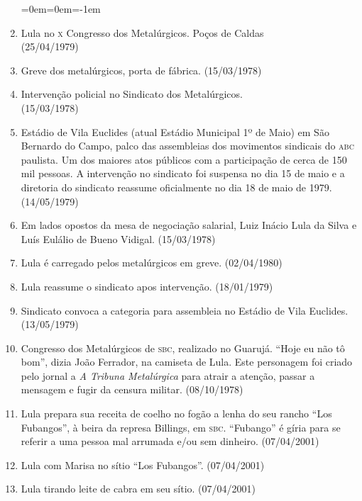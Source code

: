 \begin{enumerate}\parsep=0em\itemsep=0em\leftskip=-1em\normalsize
\item Lula no \textsc{x} Congresso dos Metalúrgicos. Poços de Caldas\\ (25/04/1979)

\item Greve dos metalúrgicos, porta de fábrica. (15/03/1978)

\item Intervenção policial no Sindicato dos Metalúrgicos.\\ (15/03/1978)

\item Estádio de Vila Euclides (atual Estádio Municipal 1º de Maio) em
São Bernardo do Campo, palco das assembleias dos movimentos sindicais do \textsc{abc}
paulista. Um dos maiores atos públicos com a participação de cerca de 150 mil
pessoas. A intervenção no sindicato foi suspensa no dia 15 de maio e a
diretoria do sindicato reassume oficialmente no dia 18 de maio de 1979.  (14/05/1979) 

\item Em lados opostos da mesa de negociação salarial, Luiz Inácio Lula da Silva e
Luís Eulálio de Bueno Vidigal. (15/03/1978)

\item Lula é carregado pelos metalúrgicos em greve. (02/04/1980)

\item Lula reassume o sindicato apos intervenção. (18/01/1979)

\item Sindicato convoca a categoria para assembleia no Estádio de Vila Euclides. (13/05/1979)

\item Congresso dos Metalúrgicos de \textsc{sbc}, realizado no Guarujá.  “Hoje eu não tô
bom”, dizia João Ferrador, na camiseta de Lula. Este personagem foi criado pelo
jornal a \textit{A Tribuna Metalúrgica} para atrair a atenção, passar a
mensagem e fugir da censura militar. (08/10/1978)

\item Lula prepara sua receita de coelho no fogão a lenha do seu rancho “Los Fubangos”, à beira da
represa Billings, em \textsc{sbc}. ``Fubango'' é gíria para se
referir a uma pessoa mal arrumada e/ou sem dinheiro. (07/04/2001)

\item Lula com Marisa no sítio “Los Fubangos”.  (07/04/2001)

\item Lula tirando leite de cabra em seu sítio. (07/04/2001)
\end{enumerate}


